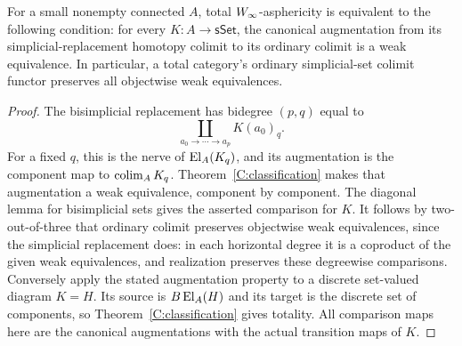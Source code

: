\begin{corollary}\label{B:homotopical-colimits}
For a small nonempty connected $A$, total $W_{\infty}$-asphericity is equivalent to the following condition: for every $K:A\to\mathsf{sSet}$, the canonical augmentation from its simplicial-replacement homotopy colimit to its ordinary colimit is a weak equivalence. In particular, a total category's ordinary simplicial-set colimit functor preserves all objectwise weak equivalences.
\end{corollary}
\begin{proof}
The bisimplicial replacement has bidegree $(p,q)$ equal to
\[
 \coprod_{a_0\to\cdots\to a_p}K(a_0)_q.
\]
For a fixed $q$, this is the nerve of $\operatorname{El}_A(K_q)$, and its augmentation is the component map to $\operatorname{colim}_AK_q$. Theorem~\ref{C:classification} makes that augmentation a weak equivalence, component by component. The diagonal lemma for bisimplicial sets gives the asserted comparison for $K$. It follows by two-out-of-three that ordinary colimit preserves objectwise weak equivalences, since the simplicial replacement does: in each horizontal degree it is a coproduct of the given weak equivalences, and realization preserves these degreewise comparisons. Conversely apply the stated augmentation property to a discrete set-valued diagram $K=H$. Its source is $B\operatorname{El}_A(H)$ and its target is the discrete set of components, so Theorem~\ref{C:classification} gives totality. All comparison maps here are the canonical augmentations with the actual transition maps of $K$.
\end{proof}
